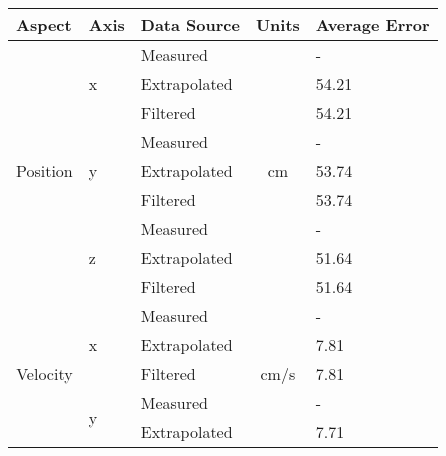 \begin{table}[ht]
\centering
\begin{tabular}{@{}cllcl@{}}
\toprule
\multicolumn{1}{l}{Aspect}                    & Axis                   & Data Source  & \multicolumn{1}{l}{Units} & Average Error \\ \midrule
\multicolumn{1}{l}{\multirow{9}{*}{Position}} & \multirow{3}{*}{x}     & Measured     & \multirow{9}{*}{cm}       & -          \\
\multicolumn{1}{l}{}                          &                        & Extrapolated &                           & 54.21          \\
\multicolumn{1}{l}{}                          &                        & Filtered     &                           & 54.21          \\
\multicolumn{1}{l}{}                          & \multirow{3}{*}{y}     & Measured     &                           & -          \\
\multicolumn{1}{l}{}                          &                        & Extrapolated &                           & 53.74          \\
\multicolumn{1}{l}{}                          &                        & Filtered     &                           & 53.74          \\
\multicolumn{1}{l}{}                          & \multirow{3}{*}{z}     & Measured     &                           & -         \\
\multicolumn{1}{l}{}                          &                        & Extrapolated &                           & 51.64          \\
\multicolumn{1}{l}{}                          &                        & Filtered     &                           & 51.64          \\ \midrule
\multirow{9}{*}{Velocity}                     & \multirow{3}{*}{x}     & Measured     & \multirow{9}{*}{cm/s}     & -        \\
                                              &                        & Extrapolated &                           & 7.81          \\
                                              &                        & Filtered     &                           & 7.81          \\
                                              & \multirow{3}{*}{y}     & Measured     &                           & -        \\
                                              &                        & Extrapolated &                           & 7.71          \\

\end{tabular}
\end{table}
